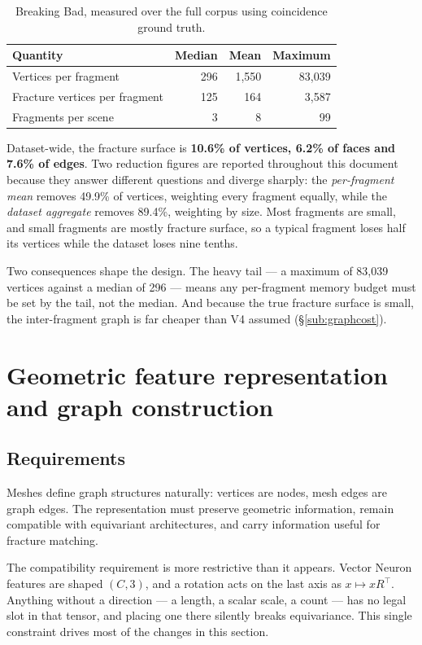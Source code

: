 \documentclass[11pt,a4paper]{report}
\newcommand{\measured}[1]{\textbf{#1}}
\begin{document}
\begin{table}[h]
\centering
\small
\begin{tabular}{lrrr}
\toprule
\textbf{Quantity} & \textbf{Median} & \textbf{Mean} & \textbf{Maximum} \\
\midrule
Vertices per fragment & 296 & 1{,}550 & 83{,}039 \\
Fracture vertices per fragment & 125 & 164 & 3{,}587 \\
Fragments per scene & 3 & 8 & 99 \\
\bottomrule
\end{tabular}
\caption{Breaking Bad, measured over the full corpus using coincidence ground
truth.}
\label{tab:dataset}
\end{table}

Dataset-wide, the fracture surface is \measured{10.6\% of vertices, 6.2\% of
faces and 7.6\% of edges}. Two reduction figures are reported throughout this
document because they answer different questions and diverge sharply: the
\emph{per-fragment mean} removes 49.9\% of vertices, weighting every fragment
equally, while the \emph{dataset aggregate} removes 89.4\%, weighting by size.
Most fragments are small, and small fragments are mostly fracture surface, so a
typical fragment loses half its vertices while the dataset loses nine tenths.

Two consequences shape the design. The heavy tail --- a maximum of 83{,}039
vertices against a median of 296 --- means any per-fragment memory budget must
be set by the tail, not the median. And because the true fracture surface is
small, the inter-fragment graph is far cheaper than V4 assumed
(\S\ref{sub:graphcost}).

\section{Geometric feature representation and graph construction}
\label{sec:features}

\subsection{Requirements}
\label{sub:requirements}

Meshes define graph structures naturally: vertices are nodes, mesh edges are
graph edges. The representation must preserve geometric information, remain
compatible with equivariant architectures, and carry information useful for
fracture matching.

The compatibility requirement is more restrictive than it appears. Vector Neuron
features are shaped $(C,3)$, and a rotation acts on the last axis as
$x \mapsto x R^{\top}$. Anything without a direction --- a length, a scalar
scale, a count --- has no legal slot in that tensor, and placing one there
silently breaks equivariance. This single constraint drives most of the changes
in this section.
\end{document}
